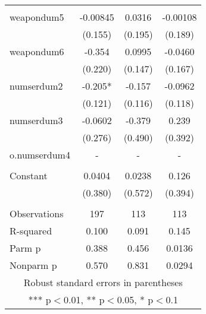 \documentclass[]{article}
\begin{document}
\begin{tabular}{lccc}
 &  &  &  \\
weapondum5 & -0.00845 & 0.0316 & -0.00108 \\
 & (0.155) & (0.195) & (0.189) \\
weapondum6 & -0.354 & 0.0995 & -0.0460 \\
 & (0.220) & (0.147) & (0.167) \\
numserdum2 & -0.205* & -0.157 & -0.0962 \\
 & (0.121) & (0.116) & (0.118) \\
numserdum3 & -0.0602 & -0.379 & 0.239 \\
 & (0.276) & (0.490) & (0.392) \\
o.numserdum4 & - & - & - \\
 &  &  &  \\
Constant & 0.0404 & 0.0238 & 0.126 \\
 & (0.380) & (0.572) & (0.394) \\
 &  &  &  \\
Observations & 197 & 113 & 113 \\
R-squared & 0.100 & 0.091 & 0.145 \\
Parm p & 0.388 & 0.456 & 0.0136 \\
 Nonparm p & 0.570 & 0.831 & 0.0294 \\ \hline
\multicolumn{4}{c}{ Robust standard errors in parentheses} \\
\multicolumn{4}{c}{ *** p$<$0.01, ** p$<$0.05, * p$<$0.1} \\
\end{tabular}
\end{document}
